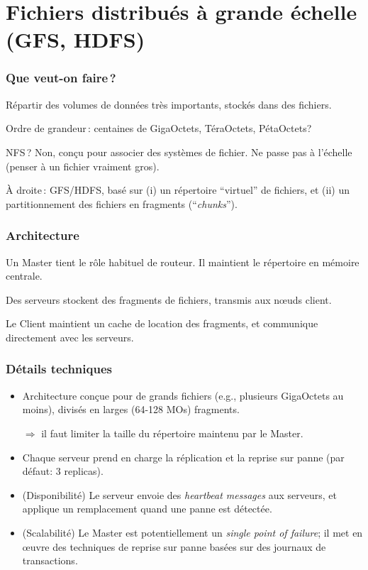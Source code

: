 \section{Fichiers distribués à grande échelle (GFS, HDFS)}


\begin{frame}
\frametitle{Que veut-on faire\,?}

Répartir des volumes de données très importants, stockés dans des fichiers.

\vfill

Ordre de grandeur\,: centaines de GigaOctets, TéraOctets, PétaOctets?

\vfill
NFS\,? Non, conçu pour associer des systèmes de fichier.  Ne passe
pas à l'échelle (penser à un fichier \alert{vraiment} gros).



À droite\,: GFS/HDFS, basé sur (i) un répertoire ``virtuel'' de fichiers, et
(ii)  un partitionnement des fichiers en fragments  (``\textit{chunks}'').

\end{frame}

\begin{frame}
\frametitle{Architecture}

Un  \alert{Master} tient le rôle habituel de \alert{routeur}. Il maintient le répertoire 
en mémoire centrale.

\vfill

Des serveurs stockent des fragments de fichiers, transmis aux n{\oe}uds client.



\vfill

Le Client maintient un \alert{cache} de location des fragments, et communique directement
avec les serveurs.

\end{frame}

\begin{frame}
\frametitle{Détails techniques}

\begin{itemize}
  \item Architecture conçue pour de grands fichiers (e.g., plusieurs
  GigaOctets au moins), divisés en larges (64-128 MOs) fragments.
 
     $\Rightarrow$ il faut limiter la taille du répertoire maintenu par le Master.
     
  \item Chaque serveur prend en charge la réplication et la reprise sur panne (par défaut: 3
  replicas).
  
  \item (\alert{Disponibilité}) Le serveur envoie des \textit{heartbeat messages} aux serveurs,
     et applique un remplacement quand une panne est détectée.
     
  \item (\alert{Scalabilité}) Le Master est potentiellement un \textit{single point of failure};
  il met en {\oe}uvre des techniques de reprise sur panne basées sur des journaux de transactions.
\end{itemize}

\end{frame}

